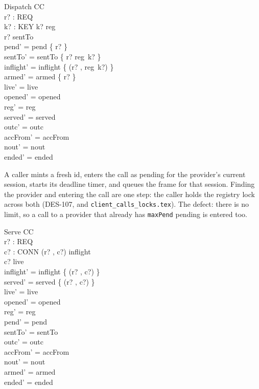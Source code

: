 \documentclass[a4paper,10pt,fleqn]{article}
\begin{document}
\begin{schema}{Dispatch}
  \Delta CC \\
  r? : REQ \\
  k? : KEY
\where
  k? \in \dom reg \\
  r? \notin \dom sentTo \\
  pend' = pend \cup \{ r? \} \\
  sentTo' = sentTo \cup \{ r? \mapsto reg~k? \} \\
  inflight' = inflight \cup \{ (r? , reg~k?) \} \\
  armed' = armed \cup \{ r? \} \\
  live' = live \\
  opened' = opened \\
  reg' = reg \\
  served' = served \\
  outc' = outc \\
  accFrom' = accFrom \\
  nout' = nout \\
  ended' = ended
\end{schema}

A caller mints a fresh id, enters the call as pending for the provider's
current session, starts its deadline timer, and queues the frame for that
session.  Finding the provider and entering the call are one step: the
caller holds the registry lock across both (DES-107, and
\texttt{client\_calls\_locks.tex}).  The defect: there is no limit, so a call
to a provider that already has \texttt{maxPend} pending is entered too.

\begin{schema}{Serve}
  \Delta CC \\
  r? : REQ \\
  c? : CONN
\where
  (r? , c?) \in inflight \\
  c? \in live \\
  inflight' = inflight \setminus \{ (r? , c?) \} \\
  served' = served \cup \{ (r? , c?) \} \\
  live' = live \\
  opened' = opened \\
  reg' = reg \\
  pend' = pend \\
  sentTo' = sentTo \\
  outc' = outc \\
  accFrom' = accFrom \\
  nout' = nout \\
  armed' = armed \\
  ended' = ended
\end{schema}
\end{document}
